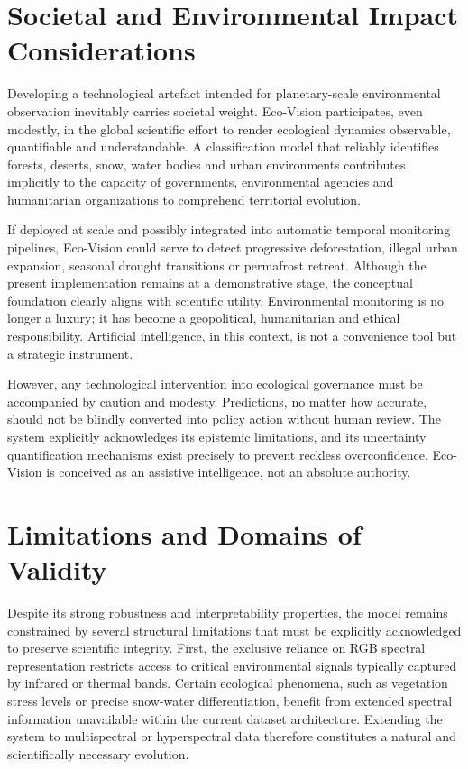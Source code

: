 \documentclass[12pt,a4paper]{report}
\begin{document}
\section{Societal and Environmental Impact Considerations}

Developing a technological artefact intended for planetary-scale environmental observation inevitably carries societal weight. Eco-Vision participates, even modestly, in the global scientific effort to render ecological dynamics observable, quantifiable and understandable. A classification model that reliably identifies forests, deserts, snow, water bodies and urban environments contributes implicitly to the capacity of governments, environmental agencies and humanitarian organizations to comprehend territorial evolution.

If deployed at scale and possibly integrated into automatic temporal monitoring pipelines, Eco-Vision could serve to detect progressive deforestation, illegal urban expansion, seasonal drought transitions or permafrost retreat. Although the present implementation remains at a demonstrative stage, the conceptual foundation clearly aligns with scientific utility. Environmental monitoring is no longer a luxury; it has become a geopolitical, humanitarian and ethical responsibility. Artificial intelligence, in this context, is not a convenience tool but a strategic instrument.

However, any technological intervention into ecological governance must be accompanied by caution and modesty. Predictions, no matter how accurate, should not be blindly converted into policy action without human review. The system explicitly acknowledges its epistemic limitations, and its uncertainty quantification mechanisms exist precisely to prevent reckless overconfidence. Eco-Vision is conceived as an assistive intelligence, not an absolute authority.

\section{Limitations and Domains of Validity}

Despite its strong robustness and interpretability properties, the model remains constrained by several structural limitations that must be explicitly acknowledged to preserve scientific integrity. First, the exclusive reliance on RGB spectral representation restricts access to critical environmental signals typically captured by infrared or thermal bands. Certain ecological phenomena, such as vegetation stress levels or precise snow-water differentiation, benefit from extended spectral information unavailable within the current dataset architecture. Extending the system to multispectral or hyperspectral data therefore constitutes a natural and scientifically necessary evolution.
\end{document}
